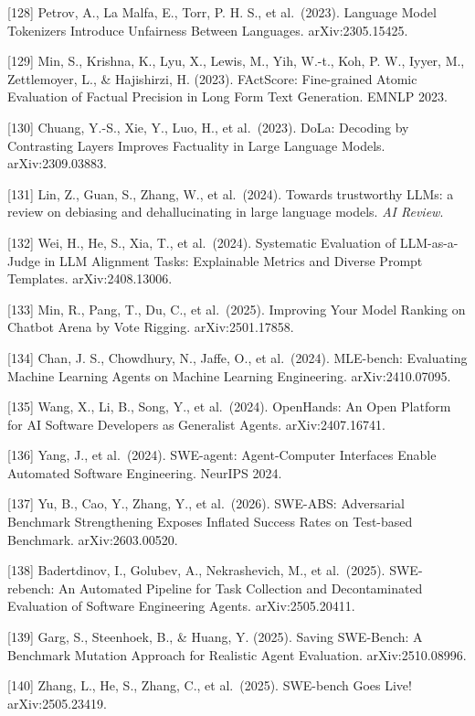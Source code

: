 {[}128{]} Petrov, A., La Malfa, E., Torr, P. H. S., et al.~(2023). Language Model Tokenizers Introduce Unfairness Between Languages. arXiv:2305.15425.

{[}129{]} Min, S., Krishna, K., Lyu, X., Lewis, M., Yih, W.-t., Koh, P. W., Iyyer, M., Zettlemoyer, L., \& Hajishirzi, H. (2023). FActScore: Fine-grained Atomic Evaluation of Factual Precision in Long Form Text Generation. EMNLP 2023.

{[}130{]} Chuang, Y.-S., Xie, Y., Luo, H., et al.~(2023). DoLa: Decoding by Contrasting Layers Improves Factuality in Large Language Models. arXiv:2309.03883.

{[}131{]} Lin, Z., Guan, S., Zhang, W., et al.~(2024). Towards trustworthy LLMs: a review on debiasing and dehallucinating in large language models. \emph{AI Review}.

{[}132{]} Wei, H., He, S., Xia, T., et al.~(2024). Systematic Evaluation of LLM-as-a-Judge in LLM Alignment Tasks: Explainable Metrics and Diverse Prompt Templates. arXiv:2408.13006.

{[}133{]} Min, R., Pang, T., Du, C., et al.~(2025). Improving Your Model Ranking on Chatbot Arena by Vote Rigging. arXiv:2501.17858.

{[}134{]} Chan, J. S., Chowdhury, N., Jaffe, O., et al.~(2024). MLE-bench: Evaluating Machine Learning Agents on Machine Learning Engineering. arXiv:2410.07095.

{[}135{]} Wang, X., Li, B., Song, Y., et al.~(2024). OpenHands: An Open Platform for AI Software Developers as Generalist Agents. arXiv:2407.16741.

{[}136{]} Yang, J., et al.~(2024). SWE-agent: Agent-Computer Interfaces Enable Automated Software Engineering. NeurIPS 2024.

{[}137{]} Yu, B., Cao, Y., Zhang, Y., et al.~(2026). SWE-ABS: Adversarial Benchmark Strengthening Exposes Inflated Success Rates on Test-based Benchmark. arXiv:2603.00520.

{[}138{]} Badertdinov, I., Golubev, A., Nekrashevich, M., et al.~(2025). SWE-rebench: An Automated Pipeline for Task Collection and Decontaminated Evaluation of Software Engineering Agents. arXiv:2505.20411.

{[}139{]} Garg, S., Steenhoek, B., \& Huang, Y. (2025). Saving SWE-Bench: A Benchmark Mutation Approach for Realistic Agent Evaluation. arXiv:2510.08996.

{[}140{]} Zhang, L., He, S., Zhang, C., et al.~(2025). SWE-bench Goes Live! arXiv:2505.23419.


